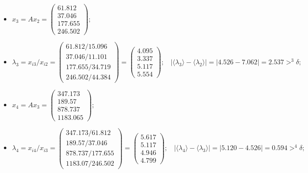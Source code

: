 \begin{itemize}
    \item
    $x_3 = Ax_2 =
    \begin{pmatrix}
        61.812\\37.046\\177.655\\246.502
    \end{pmatrix};$
    \item
    $\lambda_3 = x_{i3} / x_{i2} =
    \begin{pmatrix}
        61.812/15.096\\37.046/11.101\\177.655/34.719\\246.502/44.384
    \end{pmatrix} =
    \begin{pmatrix}
        4.095\\3.337\\5.117\\5.554
    \end{pmatrix};~~~~
    |\langle\lambda_3\rangle-\langle\lambda_2\rangle| = |4.526 - 7.062| = 2.537 >^3 \delta;$



    \item
    $x_4 = Ax_3 =
    \begin{pmatrix}
        347.173\\189.57\\878.737\\1183.065
    \end{pmatrix};$
    \item
    $\lambda_4 = x_{i4} / x_{i3} =
    \begin{pmatrix}
        347.173/61.812\\189.57/37.046\\878.737/177.655\\1183.07/246.502
    \end{pmatrix} =
    \begin{pmatrix}
        5.617\\5.117\\4.946\\4.799
    \end{pmatrix};~~~~
    |\langle\lambda_4\rangle-\langle\lambda_3\rangle| = |5.120 - 4.526| = 0.594 >^4 \delta;$




\end{itemize}
